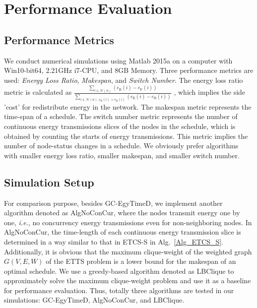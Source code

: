 \documentclass[12pt,journal,onecolumn,draftcls]{IEEEtran}
\begin{document}
\section{Performance Evaluation}
\label{sec_sim}
\subsection{Performance Metrics}
We conduct numerical simulations using Matlab 2015a on a computer with Win10-bit64, 2.21GHz i7-CPU, and 8GB Memory. Three performance metrics are used: \textit{Energy Loss Ratio}, \textit{Makespan}, and \textit{Switch Number}. The energy loss ratio metric is calculated as  $\frac{\sum_{i{\in}\mathcal{N}(n)}(e_\text{B}(i){-}e_\text{F}(i))}{\sum_{i{\in}\mathcal{N}(n),e_\text{E}(i){>}e_\text{B}(i)}(e_\text{E}(i){-}e_\text{B}(i))}$   , which implies the side 'cost' for redistribute energy in the network. The makespan metric represents the time-span of a schedule. The switch number metric represents the number of continuous energy transmissions slices of the nodes in the schedule, which is obtained by counting the starts of energy transmissions. This metric implies the number of node-status changes in a schedule. We obviously prefer algorithms with smaller energy loss ratio, smaller makespan, and smaller switch number.

\subsection{Simulation Setup}
For comparison purpose, besides GC-EgyTimeD, we implement another algorithm denoted as AlgNoConCur, where the nodes transmit energy one by one, \textit{i.e.}, no concurrency energy transmissions even for non-neighboring nodes. In AlgNoConCur, the time-length of each continuous energy transmission slice is determined in a way similar to that in ETCS-S in Alg.~\ref{Alg_ETCS_S}. Additionally, it is obvious that the maximum clique-weight of the weighted graph $G(V,E,W)$ of the ETTS problem is a lower bound for the makespan of an optimal schedule. We use a greedy-based algorithm denoted as LBClique to approximately solve the maximum clique-weight problem and use it as a baseline for performance evaluation. Thus, totally three algorithms are tested in our simulations: GC-EgyTimeD, AlgNoConCur, and LBClique.
\end{document}
